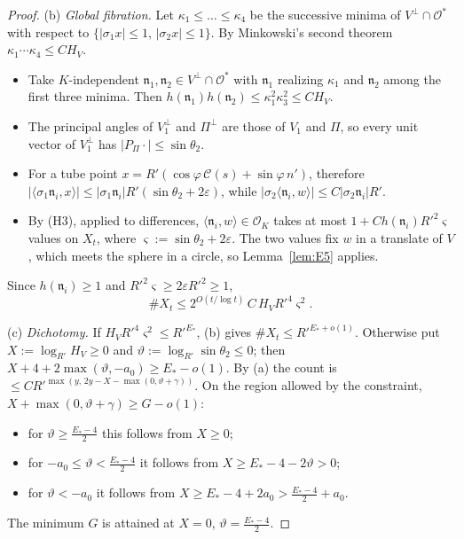\documentclass[aps,prx,twocolumn,superscriptaddress,nofootinbib,longbibliography]{revtex4-2}
\theoremstyle{plain}
\theoremstyle{definition}
\theoremstyle{remark}
\begin{document}
\begin{proof}
(b) \emph{Global fibration.} Let $\kappa_1\le\dots\le\kappa_4$ be the successive minima of $V^\perp\cap\mathcal O^*$ with respect to $\{|\sigma_1x|\le1,\,|\sigma_2x|\le1\}$. By Minkowski's second theorem $\kappa_1\cdots\kappa_4\le CH_V$.
\begin{itemize}\setlength\itemsep{0pt}
\item Take $K$-independent $\mathfrak n_1,\mathfrak n_2\in V^\perp\cap\mathcal O^*$ with $\mathfrak n_1$ realizing $\kappa_1$ and $\mathfrak n_2$ among the first three minima. Then $h(\mathfrak n_1)h(\mathfrak n_2)\le\kappa_1^2\kappa_3^2\le CH_V$.
\item The principal angles of $V_1^\perp$ and $\Pi^\perp$ are those of $V_1$ and $\Pi$, so every unit vector of $V_1^\perp$ has $|P_\Pi\cdot|\le\sin\theta_2$.
\item For a tube point $x=R'(\cos\varphi\,\mathcal C(s)+\sin\varphi\,n')$, therefore $|\langle\sigma_1\mathfrak n_i,x\rangle|\le|\sigma_1\mathfrak n_i|R'(\sin\theta_2+2\varepsilon)$, while $|\sigma_2\langle\mathfrak n_i,w\rangle|\le C|\sigma_2\mathfrak n_i|R'$.
\item By (H3), applied to differences, $\langle\mathfrak n_i,w\rangle\in\mathcal O_K$ takes at most $1+Ch(\mathfrak n_i)R'^2\varsigma$ values on $X_t$, where $\varsigma:=\sin\theta_2+2\varepsilon$. The two values fix $w$ in a translate of $V$, which meets the sphere in a circle, so Lemma~\ref{lem:E5} applies.
\end{itemize}
Since $h(\mathfrak n_i)\ge1$ and $R'^2\varsigma\ge2\varepsilon R'^2\ge1$,
\[
\#X_t\le2^{O(t/\log t)}\,C\,H_VR'^4\varsigma^2 .
\]

(c) \emph{Dichotomy.} If $H_VR'^4\varsigma^2\le R'^{E_*}$, (b) gives $\#X_t\le R'^{E_*+o(1)}$. Otherwise put $X:=\log_{R'}H_V\ge0$ and $\vartheta:=\log_{R'}\sin\theta_2\le0$; then $X+4+2\max(\vartheta,-a_0)\ge E_*-o(1)$. By (a) the count is $\le CR'^{\max(y,\,2y-X-\max(0,\vartheta+\gamma))}$. On the region allowed by the constraint, $X+\max(0,\vartheta+\gamma)\ge G-o(1)$:
\begin{itemize}\setlength\itemsep{0pt}
\item for $\vartheta\ge\tfrac{E_*-4}2$ this follows from $X\ge0$;
\item for $-a_0\le\vartheta<\tfrac{E_*-4}2$ it follows from $X\ge E_*-4-2\vartheta>0$;
\item for $\vartheta<-a_0$ it follows from $X\ge E_*-4+2a_0>\tfrac{E_*-4}2+a_0$.
\end{itemize}
The minimum $G$ is attained at $X=0$, $\vartheta=\tfrac{E_*-4}2$.
\end{proof}
\end{document}
